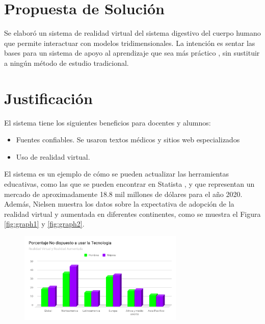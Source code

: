 \section{Propuesta de Solución}
Se elaboró un sistema de realidad virtual del sistema digestivo del cuerpo humano que permite interactuar con modelos tridimensionales. La intención es sentar las bases
 para un sistema de apoyo al aprendizaje que sea más práctico \cite{moore1995learning}, sin sustituir a ningún método de estudio tradicional.
\\
\newline

\section{Justificación}
\label{just}
El sistema tiene los siguientes beneficios para docentes y alumnos: 
\begin{itemize}
\item Fuentes confiables. Se usaron textos médicos y sitios web especializados
\item Uso de realidad virtual\cite{norton1994integrating}.
\end{itemize}
El sistema es un ejemplo de cómo se pueden actualizar las herramientas educativas, como las que se pueden encontrar en Statista \cite{web1},
 y que representan un mercado de aproximadamente 18.8 mil millones de dólares para el año 2020. Además, Nielsen\cite{web2} muestra los datos
  sobre la expectativa de adopción de la realidad virtual y aumentada en diferentes continentes, como se muestra el Figura \ref{fig:graph1} y \ref{fig:graph2}.
\begin{figure}[H]
	\begin{center}
 		\includegraphics[width = 0.7\textwidth]{source/images/image2.png}
	\end{center} 
\end{figure}
